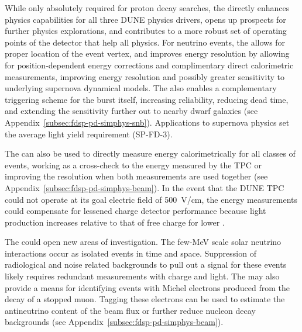 While only absolutely required for proton decay searches, the  directly enhances physics capabilities for all three DUNE physics drivers, opens up prospects for further physics explorations, and contributes to a more robust set of operating points of the detector that help all physics.   For  neutrino events, the  allows for proper location of the event vertex, and improves energy resolution by allowing for position-dependent energy corrections and complimentary direct calorimetric measurements, 
improving energy resolution and possibly greater sensitivity to underlying supernova dynamical models.  The  also enables a complementary triggering scheme for the burst itself, increasing 
reliability, reducing dead time, and extending the sensitivity further out to nearby dwarf galaxies (see Appendix~\ref{subsec:fdsp-pd-simphys-snb}). Applications to supernova physics set the average light yield requirement (SP-FD-3).


The  can also be used to directly measure energy calorimetrically for all classes of events, working as a cross-check to the energy measured by the TPC or improving the resolution when both measurements are used together (see Appendix~\ref{subsec:fdsp-pd-simphys-beam}).  In the event that the DUNE TPC could not operate at its goal electric field of \SI{500}{V/cm}, the  energy measurements could compensate for lessened charge detector performance because light production increases relative to that of free charge for lower \efield{}.

The  could open new areas of investigation.  The few-MeV scale solar neutrino interactions occur as isolated events in time and space.  Suppression of radiological and noise related backgrounds to pull out a signal for these events likely requires  redundant measurements with charge and light.  The  may also provide a means for identifying events with Michel electrons produced from the decay of a stopped muon. Tagging these electrons can be used to estimate the antineutrino content of the beam flux or further reduce nucleon decay backgrounds (see Appendix~\ref{subsec:fdsp-pd-simphys-beam}).
 
